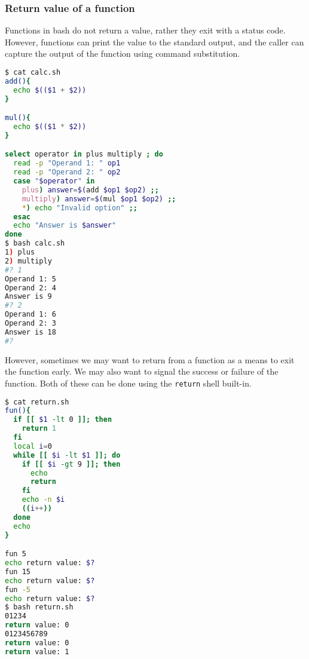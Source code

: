 \subsubsection{Return value of a function}

Functions in bash do not return a value, rather they exit with a status code.
However, functions can print the value to the standard output, and the caller can capture the output of the function using command substitution.

\begin{lstlisting}[language=bash]
$ cat calc.sh
add(){
  echo $(($1 + $2))
}

mul(){
  echo $(($1 * $2))
}

select operator in plus multiply ; do
  read -p "Operand 1: " op1
  read -p "Operand 2: " op2
  case "$operator" in
    plus) answer=$(add $op1 $op2) ;;
    multiply) answer=$(mul $op1 $op2) ;;
    *) echo "Invalid option" ;;
  esac
  echo "Answer is $answer"
done
$ bash calc.sh
1) plus
2) multiply
#? 1
Operand 1: 5
Operand 2: 4
Answer is 9
#? 2
Operand 1: 6
Operand 2: 3
Answer is 18
#?
\end{lstlisting}

However, sometimes we may want to return from a function as a means to exit the function early. We may also want to signal the success or failure of the function.
Both of these can be done using the \lstinline|return| shell built-in.

\begin{lstlisting}[language=bash]
$ cat return.sh
fun(){
  if [[ $1 -lt 0 ]]; then
    return 1
  fi
  local i=0
  while [[ $i -lt $1 ]]; do
    if [[ $i -gt 9 ]]; then
      echo
      return
    fi
    echo -n $i
    ((i++))
  done
  echo
}

fun 5
echo return value: $?
fun 15
echo return value: $?
fun -5
echo return value: $?
$ bash return.sh
01234
return value: 0
0123456789
return value: 0
return value: 1
\end{lstlisting}

